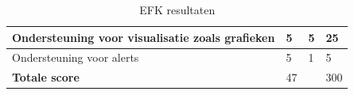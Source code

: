 \begin{table}[ht]
\begin{tabular}{| m{20em} | m{2cm} | m{2cm} | m{2cm} | }
        Ondersteuning voor visualisatie zoals grafieken                                                                   & 5                     & 5                   & 25                            \\ \hline
        Ondersteuning voor alerts                                                                                         & 5                     & 1                   & 5                             \\ \hline
        \textbf{Totale score}                                                                                             & 47                    &                     & 300                           \\ \hline
    \end{tabular}
    \caption{EFK resultaten}
    \label{tab:EFK-resultaten}
\end{table}